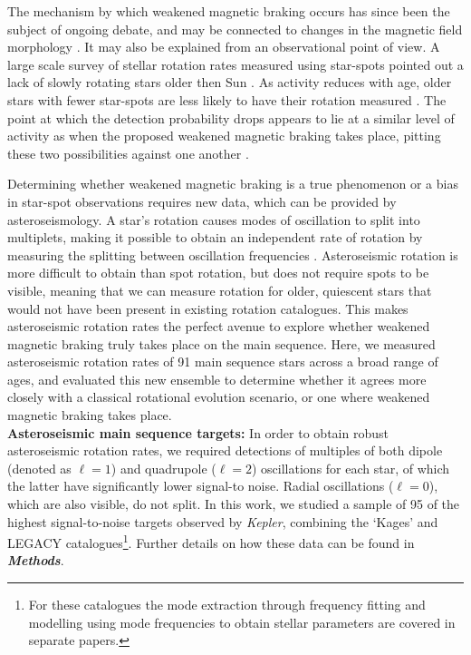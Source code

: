 \documentclass[12pt]{article}
\begin{document}
The mechanism by which weakened magnetic braking occurs has since been the subject of ongoing debate, and may be connected to changes in the magnetic field morphology \cite{reville+2015,garraffo+2016, metcalfe+2019, see+2019}. It may also be explained from an observational point of view. A large scale survey of stellar rotation rates measured using star-spots pointed out a lack of slowly rotating stars older then Sun \cite{mcquillan+2014}. As activity reduces with age, older stars with fewer star-spots are less likely to have their rotation measured \cite{matt+2015}. The point at which the detection probability drops appears to lie at a similar level of activity as when the proposed weakened magnetic braking takes place, pitting these two possibilities against one another \cite{vansaders+2019}.

Determining whether weakened magnetic braking is a true phenomenon or a bias in star-spot observations requires new data, which can be provided by asteroseismology. A star's rotation causes modes of oscillation to split into multiplets, making it possible to obtain an independent rate of rotation by measuring the splitting between oscillation frequencies \cite{ledoux1951}. Asteroseismic rotation is more difficult to obtain than spot rotation, but does not require spots to be visible, meaning that we can measure rotation for older, quiescent stars that would not have been present in existing rotation catalogues. This makes asteroseismic rotation rates the perfect avenue to explore whether weakened magnetic braking truly takes place on the main sequence. Here, we measured asteroseismic rotation rates of 91 main sequence stars across a broad range of  ages, and evaluated this new ensemble to determine whether it agrees more closely with a classical rotational evolution scenario, or one where weakened magnetic braking takes place.\\

\textbf{Asteroseismic main sequence targets:} In order to obtain robust asteroseismic rotation rates, we required detections of multiples of both dipole (denoted as $\ell = 1$) and quadrupole ($\ell = 2$) oscillations for each star, of which the latter have significantly lower signal-to noise. Radial oscillations ($\ell = 0$), which are also visible, do not split. In this work, we studied a sample of 95 of the highest signal-to-noise targets observed by \textit{Kepler}, combining the `Kages' \cite{silvaaguirre+2015,davies+2016} and LEGACY \cite{lund+2017, silvaaguirre+2017} catalogues\footnote{For these catalogues the mode extraction through frequency fitting \cite{davies+2016, lund+2017} and modelling using mode frequencies to obtain stellar parameters \cite{silvaaguirre+2015, silvaaguirre+2017} are covered in separate papers.}. Further details on how these data can be found in \textbf{\textit{Methods}}. 
\end{document}
